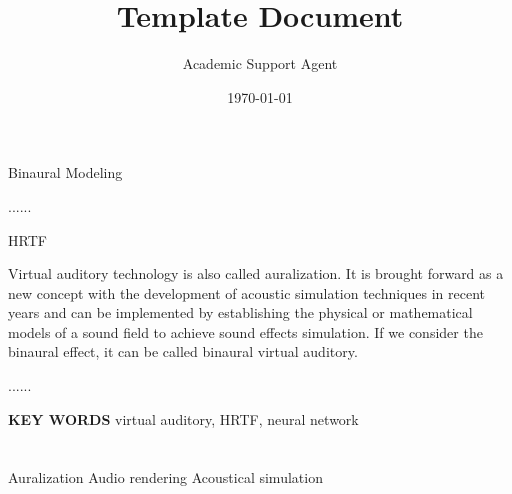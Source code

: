 \documentclass{article}
\title{Template Document}
\author{Academic Support Agent}
\date{\today}
\begin{document}
\maketitle

\maketitle

\newpage
%  
\makeabstract

 
 
 Binaural
Modeling 

......

%  
\noindent { \blackti  :} HRTF 

%  
\makeEnabstract

Virtual auditory technology is also called auralization. It is brought forward as a new concept with the development of acoustic simulation techniques in recent years and can be implemented by establishing the physical or mathematical models of a sound field to achieve sound effects simulation. If we consider the binaural effect, it can be called binaural virtual auditory.

......

\noindent \textbf{ KEY WORDS }virtual auditory, HRTF, neural network

%  
\makecontent

%  
\maketext

\section{ }
\subsection{ }
\subsubsection{ }

 Auralization \cite{Xu_2023_ICCV} \cite{li2021learning} Audio rendering Acoustical simulation 
\makespace
\section{ }
\subsection{ }
\end{document}
